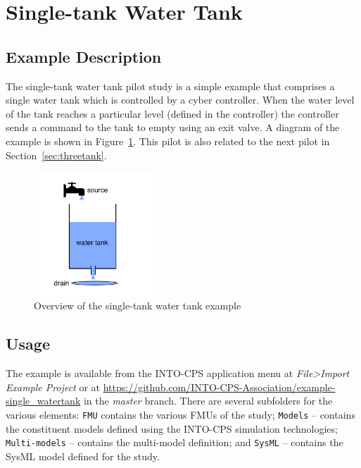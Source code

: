 \section{Single-tank Water Tank}
\label{sec:singletank}

\subsection{Example Description}
\label{sec:singletank_desc}

The single-tank water tank pilot study is a simple example that comprises a single water tank which is controlled by a cyber controller. When the water level of the tank reaches a particular level (defined in the controller) the controller sends a command to the tank to empty using an exit valve. A diagram of the example is shown in Figure~\ref{fig:singletankoverview}. 
This pilot is also related to the next pilot in Section~\ref{sec:threetank}. 

\begin{figure}[htbp]
\begin{center}
\includegraphics[width=0.4\textwidth]{singletank/singletank}
\caption{Overview of the single-tank water tank example}
\label{fig:singletankoverview}
\end{center}
\end{figure}

\subsection{Usage}
\label{sec:singletank_usage}

The example is available from the INTO-CPS application menu at \emph{File>Import Example Project} or at \url{https://github.com/INTO-CPS-Association/example-single_watertank} in the \emph{master} branch. There are several subfolders for the various elements: \texttt{FMU} contains the various FMUs of the study; \texttt{Models} -- contains the constituent models defined using the INTO-CPS simulation technologies; \texttt{Multi-models} -- contains the multi-model definition;  and \texttt{SysML} -- contains the SysML model defined for the study.

